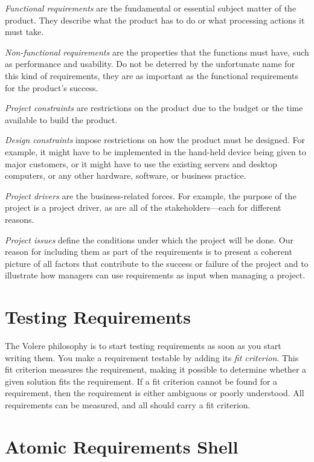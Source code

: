 \documentclass[
]{article}
\begin{document}
\emph{Functional requirements} are the fundamental or essential subject
matter of the product. They describe what the product has to do or what
processing actions it must take.

\emph{Non-functional requirements} are the properties that the functions
must have, such as performance and usability. Do not be deterred by the
unfortunate name for this kind of requirements, they are as important as
the functional requirements for the product's success.

\emph{Project constraints} are restrictions on the product due to the
budget or the time available to build the product.

\emph{Design constraints} impose restrictions on how the product must be
designed. For example, it might have to be implemented in the hand-held
device being given to major customers, or it might have to use the
existing servers and desktop computers, or any other hardware, software,
or business practice.

\emph{Project drivers} are the business-related forces. For example, the
purpose of the project is a project driver, as are all of the
stakeholders---each for different reasons.

\emph{Project issues} define the conditions under which the project will
be done. Our reason for including them as part of the requirements is to
present a coherent picture of all factors that contribute to the success
or failure of the project and to illustrate how managers can use
requirements as input when managing a project.

\hypertarget{testing-requirements}{%
\section{Testing Requirements}\label{testing-requirements}}

The Volere philosophy is to start testing requirements as soon as you
start writing them. You make a requirement testable by adding its
\emph{fit criterion}. This fit criterion measures the requirement,
making it possible to determine whether a given solution fits the
requirement. If a fit criterion cannot be found for a requirement, then
the requirement is either ambiguous or poorly understood. All
requirements can be measured, and all should carry a fit criterion.

\hypertarget{atomic-requirements-shell}{%
\section{Atomic Requirements Shell}\label{atomic-requirements-shell}}
\end{document}
